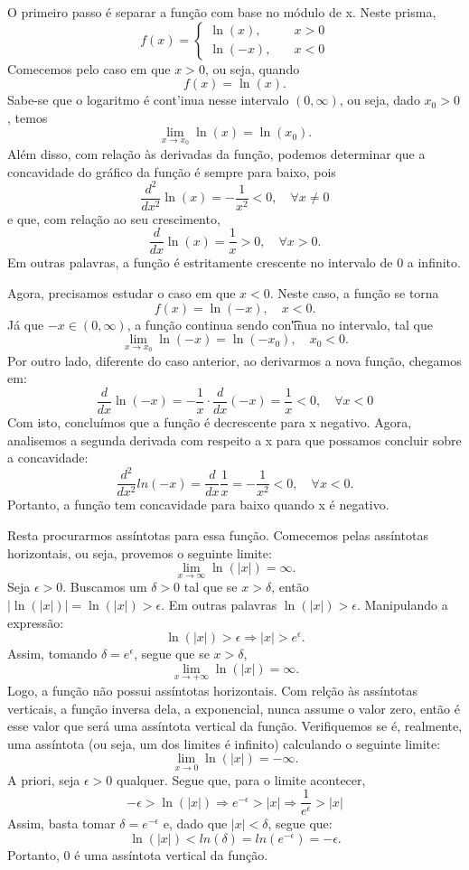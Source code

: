 \documentclass[Calculus1/exercícios_de_cálculo.tex]{subfiles}
\begin{document}
\begin{proof*}
	O primeiro passo é separar a função com base no módulo de x. Neste
	prisma,
	\[
		f(x) = \left\{
		\begin{array}{ll}
			\ln(x), \quad  & x > 0 \\
			\ln(-x), \quad & x < 0
		\end{array}\right.
	\]
	Comecemos pelo caso em que $x > 0$, ou seja, quando
	\[
		f(x) = \ln(x).
	\]
	Sabe-se que o logaritmo é cont'inua nesse intervalo $(0, \infty)$, ou seja,
	dado $x_{0}> 0$, temos
	\[
		\lim_{x\to{x_0}}\ln(x) = \ln(x_{0}).
	\]
	Além disso, com relação às derivadas da função, podemos
	determinar que a concavidade do gráfico da função é sempre para baixo,
	pois
	\[
		\frac{d^{2}}{dx^{2}}\ln(x) = -\frac{1}{x^{2}}< 0, \quad \forall x\neq0
	\]
	e que, com relação ao seu crescimento,
	\[
		\frac{d}{dx}\ln(x) = \frac{1}{x}> 0, \quad \forall x > 0.
	\]
	Em outras palavras, a função é estritamente crescente no intervalo de 0
	a infinito.

	Agora, precisamos estudar o caso em que $x < 0$. Neste caso, a função se torna
	\[
		f(x) = \ln(-x),\quad x < 0.
	\]
	Já que $-x\in(0, \infty)$, a função continua sendo con\t'inua no
	intervalo, tal que
	\[
		\lim_{x\to{x_0}}\ln(-x) = \ln(-x_{0}), \quad x_{0}< 0.
	\]
	Por outro lado, diferente do caso anterior, ao derivarmos a nova função, chegamos
	em:
	\[
		\frac{d}{dx}\ln(-x) = -\frac{1}{x}\cdot\frac{d}{dx}(-x) = \frac{1}{x}< 0, \quad \forall x < 0
	\]
	Com isto, concluímos que a função é decrescente para x negativo.
	Agora, analisemos a segunda derivada com respeito a x para que possamos concluir
	sobre a concavidade:
	\[
		\frac{d^{2}}{d x^{2}}ln(-x) = \frac{d}{dx}\frac{1}{x}= -\frac{1}{x^{2}}< 0, \quad \forall x < 0.
	\]
	Portanto, a função tem concavidade para baixo quando x é negativo.

	Resta procurarmos assíntotas para essa função. Comecemos pelas ass\'intotas horizontais,
	ou seja, provemos o seguinte limite:
	$$
		\lim_{x\to\infty} \ln(|x|) = \infty.
	$$
	Seja $\epsilon > 0$. Buscamos um $\delta > 0$ tal que se $x > \delta$, então $|\ln(|x|)| = \ln(|x|) > \epsilon$.
	Em outras palavras $\ln(|x|) > \epsilon$. Manipulando a expressão:
	$$
		\ln(|x|) > \epsilon \Rightarrow |x| >  e^{\epsilon}.
	$$
	Assim, tomando $\delta = e^{\epsilon}$, segue que se $x > \delta$,
	$$
		\lim_{x\to+\infty}\ln(|x|) = \infty.
	$$
	Logo, a função não possui assíntotas horizontais. Com relç\~ao às ass\'intotas
	verticais, a função inversa dela, a exponencial, nunca assume o valor zero, então é esse valor
	que será uma assíntota vertical da função. Verifiquemos se é, realmente, uma ass\'intota (ou seja, um dos
	limites é infinito) calculando o seguinte limite:
	$$
		\lim_{x\to0}\ln(|x|) = -\infty.
	$$
	A priori, seja $\epsilon > 0$ qualquer. Segue que, para o limite acontecer,
	$$
		-\epsilon > \ln(|x|) \Rightarrow e^{-\epsilon} > |x| \Rightarrow \frac{1}{e^{\epsilon}} > |x|
	$$
	Assim, basta tomar $\delta = e^{-\epsilon}$ e, dado que $|x| < \delta$, segue que:
	$$
		\ln(|x|) < ln(\delta) = ln(e^{-\epsilon}) = -\epsilon.
	$$
	Portanto, 0 é uma assíntota vertical da função.
\end{proof*}
\end{document}
